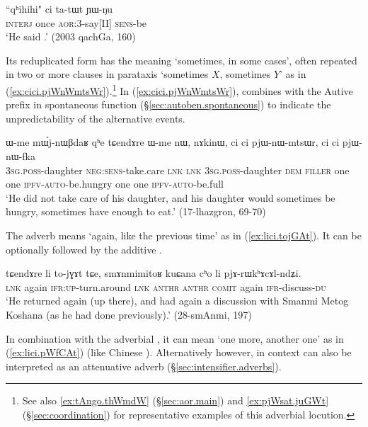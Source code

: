 \begin{exe}
\ex \label{ex:qhihihi.ci}
\gll ``qʰihihi" ci ta-tɯt ɲɯ-ŋu  \\
\textsc{interj} once \textsc{aor}:3\flobv{}-say[II] \textsc{sens}-be \\
\glt `He said .' (2003 qachGa, 160)
\end{exe}

Its reduplicated form  has the meaning `sometimes, in some cases', often repeated in two or more clauses in parataxis `sometimes $X$, sometimes $Y$'  as in (\ref{ex:cici.pjWnWmtsWr}).\footnote{See also \ref{ex:tAngo.thWmdW} (§\ref{sec:aor.main}) and \ref{ex:pjWsat.juGWt} (§\ref{sec:coordination}) for representative examples of this adverbial locution. }  In  (\ref{ex:cici.pjWnWmtsWr}),  combines with the Autive prefix in spontaneous function (§\ref{sec:autoben.spontaneous}) to indicate the unpredictability of the alternative events.
 
\begin{exe}
\ex \label{ex:cici.pjWnWmtsWr}
\gll  ɯ-me mɯ́j-nɯβdaʁ qʰe tɕendɤre ɯ-me nɯ, nɤkinɯ, ci ci pjɯ-nɯ-mtsɯr, ci ci pjɯ-nɯ-fka  \\
 \textsc{3sg}.\textsc{poss}-daughter \textsc{neg}:\textsc{sens}-take.care \textsc{lnk} \textsc{lnk}  \textsc{3sg}.\textsc{poss}-daughter \textsc{dem} \textsc{filler} one one \textsc{ipfv}-\textsc{auto}-be.hungry one one \textsc{ipfv}-\textsc{auto}-be.full \\
 \glt  `He did not take care of his daughter, and his daughter would sometimes be hungry, sometimes have enough to eat.' (17-lhazgron, 69-70)
 \end{exe}
 
 The adverb  means  `again, like the previous time' as in (\ref{ex:lici.tojGAt}). It can be optionally followed by the additive .
 
\begin{exe}
\ex \label{ex:lici.tojGAt}
\gll tɕendɤre li to-jɣɤt tɕe, smɤnmimitoʁ kuɕana cʰo li pjɤ-rɯkʰɤcɤl-ndʑi.  \\
\textsc{lnk} again \textsc{ifr}:\textsc{up}-turn.around \textsc{lnk}  \textsc{anthr} \textsc{anthr} \textsc{comit} again \textsc{ifr}-discuss-\textsc{du} \\
\glt `He returned again (up there), and had again a discussion with Smanmi Metog Koshana (as he had done previously).' (28-smAnmi, 197)
 \end{exe}

In combination with the adverbial , it can mean `one more, another one' as in (\ref{ex:lici.pWfCAt}) (like Chinese ). Alternatively however,  in context can also be interpreted as an attenuative adverb (§\ref{sec:intensifier.adverbs}).
 
